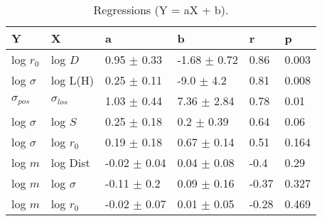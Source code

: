 \begin{table}
\centering
\caption{Regressions (Y = aX + b).}
\begin{tabular}{llllll}
\toprule
              Y &               X &                 a &                 b &      r &      p \\
\midrule
      log $r_0$ &         log $D$ &   0.95 $\pm$ 0.33 &  -1.68 $\pm$ 0.72 &   0.86 &  0.003 \\
   log $\sigma$ &        log L(H) &   0.25 $\pm$ 0.11 &    -9.0 $\pm$ 4.2 &   0.81 &  0.008 \\
 $\sigma_{pos}$ &  $\sigma_{los}$ &   1.03 $\pm$ 0.44 &   7.36 $\pm$ 2.84 &   0.78 &   0.01 \\
   log $\sigma$ &         log $S$ &   0.25 $\pm$ 0.18 &    0.2 $\pm$ 0.39 &   0.64 &   0.06 \\
   log $\sigma$ &     log $r_{0}$ &   0.19 $\pm$ 0.18 &   0.67 $\pm$ 0.14 &   0.51 &  0.164 \\
        log $m$ &        log Dist &  -0.02 $\pm$ 0.04 &   0.04 $\pm$ 0.08 &   -0.4 &   0.29 \\
        log $m$ &    log $\sigma$ &   -0.11 $\pm$ 0.2 &   0.09 $\pm$ 0.16 &  -0.37 &  0.327 \\
        log $m$ &     log $r_{0}$ &  -0.02 $\pm$ 0.07 &   0.01 $\pm$ 0.05 &  -0.28 &  0.469 \\
\bottomrule
\end{tabular}
\end{table}
